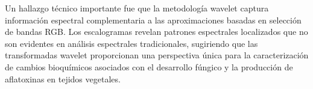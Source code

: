 \vspace{5mm}

Un hallazgo técnico importante fue que la metodología wavelet captura información espectral complementaria a las aproximaciones basadas en selección de bandas RGB. Los escalogramas revelan patrones espectrales localizados que no son evidentes en análisis espectrales tradicionales, sugiriendo que las transformadas wavelet proporcionan una perspectiva única para la caracterización de cambios bioquímicos asociados con el desarrollo fúngico y la producción de aflatoxinas en tejidos vegetales.

